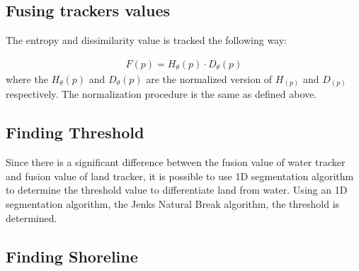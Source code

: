 \documentclass{article}
\begin{document}
\subsection{Fusing trackers values}
The entropy and dissimilarity value is tracked the following way:

\begin{align}
F(p) = H_\theta(p) \cdot D_\theta(p)
\end{align}
where the $H_\theta(p)$ and $D_\theta(p)$ are the normalized version of $H_(p)$ and $D_(p)$ respectively. The normalization procedure is the same as defined above.

\subsection{Finding Threshold}
Since there is a significant difference between the fusion value of water tracker and fusion value of land tracker, it is possible to use 1D segmentation algorithm to determine the threshold value to differentiate land from water. Using an 1D segmentation algorithm, the Jenks Natural Break algorithm, the threshold is determined.

\subsection{Finding Shoreline}
\end{document}
